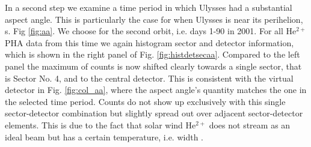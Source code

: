 In a second step we examine a time period in which Ulysses had a substantial aspect angle. This is particularly the case for when Ulysses is near its perihelion, s. Fig \ref{fig:aa}. We choose for the second orbit, i.e. days 1-90 in 2001. For all $\mathrm{He^{2+}}$ PHA data from this time we again histogram sector and detector information, which is shown in the right panel of Fig. \ref{fig:histdetsecaa}. Compared to the left panel the maximum of counts is now shifted clearly towards a single sector, that is Sector No. 4, and to the central detector. This is consistent with the virtual detector in Fig. \ref{fig:col_aa}, where the aspect angle's quantity matches the one in the selected time period. Counts do not show up exclusively with this single sector-detector combination but slightly spread out over adjacent sector-detector elements. This is due to the fact that solar wind $\mathrm{He^{2+}}$ does not stream as an ideal beam but has a certain temperature, i.e. width \citep[][,ch. 6.1]{prlss_2004}.


